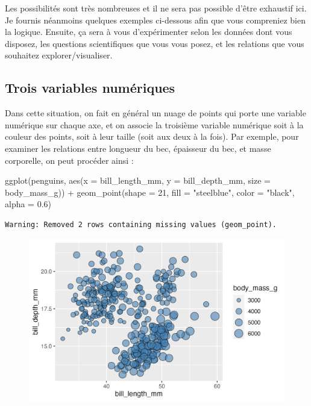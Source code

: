 \documentclass[
  letterpaper,
  DIV=11,
  numbers=noendperiod]{scrreprt}
\newenvironment{Shaded}{\begin{snugshade}}{\end{snugshade}}
\newcommand{\AttributeTok}[1]{\textcolor[rgb]{0.40,0.45,0.13}{#1}}
\newcommand{\DecValTok}[1]{\textcolor[rgb]{0.68,0.00,0.00}{#1}}
\newcommand{\FloatTok}[1]{\textcolor[rgb]{0.68,0.00,0.00}{#1}}
\newcommand{\FunctionTok}[1]{\textcolor[rgb]{0.28,0.35,0.67}{#1}}
\newcommand{\NormalTok}[1]{\textcolor[rgb]{0.00,0.23,0.31}{#1}}
\newcommand{\SpecialCharTok}[1]{\textcolor[rgb]{0.37,0.37,0.37}{#1}}
\newcommand{\StringTok}[1]{\textcolor[rgb]{0.13,0.47,0.30}{#1}}
\begin{document}
Les possibilités sont très nombreuses et il ne sera pas possible d'être
exhaustif ici. Je fournis néanmoins quelques exemples ci-dessous afin
que vous compreniez bien la logique. Ensuite, ça sera à vous
d'expérimenter selon les données dont vous disposez, les questions
scientifiques que vous vous posez, et les relations que vous souhaitez
explorer/visualiser.

\hypertarget{trois-variables-numuxe9riques}{%
\subsection{Trois variables
numériques}\label{trois-variables-numuxe9riques}}

Dans cette situation, on fait en général un nuage de points qui porte
une variable numérique sur chaque axe, et on associe la troisième
variable numérique soit à la couleur des points, soit à leur taille
(soit aux deux à la fois). Par exemple, pour examiner les relations
entre longueur du bec, épaisseur du bec, et masse corporelle, on peut
procéder ainsi :

\begin{Shaded}
\begin{Highlighting}[]
\FunctionTok{ggplot}\NormalTok{(penguins, }\FunctionTok{aes}\NormalTok{(}\AttributeTok{x =}\NormalTok{ bill\_length\_mm, }\AttributeTok{y =}\NormalTok{ bill\_depth\_mm,}
                     \AttributeTok{size =}\NormalTok{ body\_mass\_g)) }\SpecialCharTok{+}
  \FunctionTok{geom\_point}\NormalTok{(}\AttributeTok{shape =} \DecValTok{21}\NormalTok{, }\AttributeTok{fill =} \StringTok{"steelblue"}\NormalTok{, }\AttributeTok{color =} \StringTok{"black"}\NormalTok{, }\AttributeTok{alpha =} \FloatTok{0.6}\NormalTok{)}
\end{Highlighting}
\end{Shaded}

\begin{verbatim}
Warning: Removed 2 rows containing missing values (geom_point).
\end{verbatim}

\begin{figure}[H]

{\centering \includegraphics{./03-visualization_files/figure-pdf/unnamed-chunk-75-1.png}

}

\end{figure}
\end{document}
